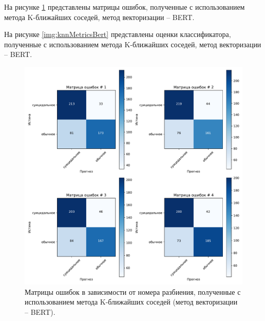 На рисунке \ref{img:knnMatrBert} представлены матрицы ошибок, полученные с использованием метода K-ближайших соседей, метод векторизации -- BERT.

На рисунке \ref{img:knnMetricsBert} представлены оценки классификатора, полученные с использованием метода K-ближайших соседей, метод векторизации -- BERT.

\begin{figure}[H]
	\centering
	\includegraphics[width=\textwidth]{inc/plots/knnMatrBert.pdf}
	\caption{ Матрицы ошибок в зависимости от номера разбиения, полученные с использованием метода K-ближайших соседей (метод векторизации -- BERT). }
	\label{img:knnMatrBert}
\end{figure}

